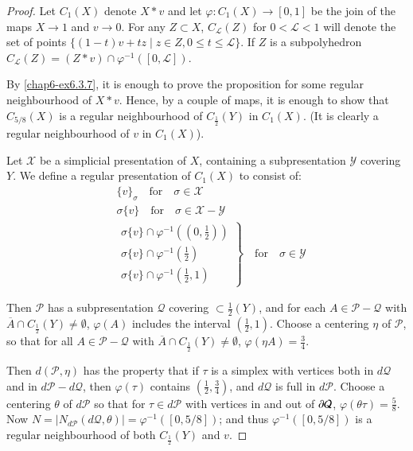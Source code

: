 \begin{proof}
Let $C_{1}(X)$ denote $X\ast v$ and let $\varphi:C_{1}(X)\to [0,1]$ be the join of the maps $X\to 1$ and $v\to 0$. For any $Z\subset X$, $C_{\mathcal{L}}(Z)$ for $0<\mathcal{L}<1$ will denote the set of points $\{(1-t)v+tz\mid z\in Z,0\leq t\leq \mathcal{L}\}$. If $Z$ is a subpolyhedron $C_{\mathcal{L}}(Z)=(Z\ast v)\cap \varphi^{-1}([0,\mathcal{L}])$. 


By \ref{chap6-ex6.3.7}, it is enough to prove the proposition for some regular neighbourhood of $X\ast v$. Hence, by a couple of maps, it is enough to show that $C_{5/8}(X)$ is a regular neighbourhood of $C_{\frac{1}{2}}(Y)$ in $C_{1}(X)$. (It is clearly a regular neighbourhood of $v$ in $C_{1}(X)$).

Let $\mathscr{X}$ be a simplicial presentation of $X$, containing a subpresentation $\mathscr{Y}$ covering $Y$. We define a regular presentation of $C_{1}(X)$ to consist of:
\begin{align*}
& \{v\}_{\sigma}\quad\text{for}\quad \sigma\in\mathscr{X}\\
& \sigma\{v\}\quad\text{for}\quad \sigma\in \mathscr{X}-\mathscr{Y}\\
& \left.
\begin{array}{l}
\sigma\{v\}\cap \varphi^{-1}((0,\frac{1}{2}))\\
\sigma\{v\}\cap \varphi^{-1}(\frac{1}{2})\\
\sigma\{v\}\cap \varphi^{-1}(\frac{1}{2},1)
\end{array}\right\}\quad\text{for}\quad \sigma\in \mathscr{Y}
\end{align*}\pageoriginale

Then $\mathscr{P}$ has a subpresentation $\mathcal{Q}$ covering $\subset \frac{1}{2}(Y)$, and for each $A\in\mathscr{P}-\mathcal{Q}$ with $\overline{A}\cap C_{\frac{1}{2}}(Y)\ne \emptyset$, $\varphi(A)$ includes the interval $(\frac{1}{2},1)$. Choose a centering $\eta$ of $\mathscr{P}$, so that for all $A\in \mathscr{P}-\mathcal{Q}$ with $\overline{A}\cap C_{\frac{1}{2}}(Y)\neq \emptyset$, $\varphi(\eta A)=\frac{3}{4}$.

Then $d(\mathscr{P},\eta)$ has the property that if $\tau$ is a simplex with vertices both in $d\mathcal{Q}$ and in $d\mathscr{P}-d\mathcal{Q}$, then $\varphi(\tau)$ contains $(\frac{1}{2},\frac{3}{4})$,  and $d\mathcal{Q}$ is full in $d\mathscr{P}$. Choose a centering $\theta$ of $d\mathscr{P}$ so that for $\tau \in d\mathscr{P}$ with vertices in and out of $\partial \mathcal{Q}$, $\varphi(\theta\tau)=\frac{5}{8}$. Now $N=|N_{d\mathscr{P}}(d\mathcal{Q},\theta)|=\varphi^{-1}([0,5/8])$; and thus $\varphi^{-1}([0,5/8])$ is a regular neighbourhood of both $C_{\frac{1}{2}}(Y)$ and $v$. 
\end{proof}

